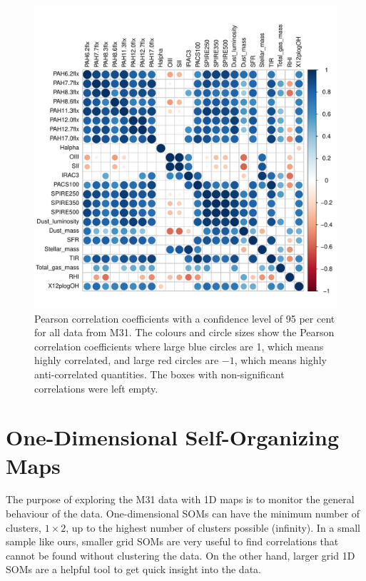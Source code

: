       \begin{figure}
        \centering
        \includegraphics[width=\textwidth]{../image_paper3/images0.01/cor_plots/M31_all_derived_ones_core_plot_for_paper.pdf}
        \caption[Pearson correlation coefficients for data from 10 regions in M31]{Pearson correlation coefficients with a confidence level of 95 per cent for all data from M31. The colours and circle sizes show the Pearson correlation coefficients where large blue circles are 1, which means highly correlated, and large red circles are $-1$, which means highly anti-correlated quantities. The boxes with non-significant correlations were left empty.}
        \label{fig: cor_all}
    \end{figure}
 
\section{One-Dimensional Self-Organizing Maps}
    \label{Sec: 1d_cluster}
    The purpose of  exploring the M31 data with 1D maps is to monitor the general behaviour of the data. 
    One-dimensional SOMs can have the minimum number of clusters, $1\times2$, up to the highest number of clusters possible (infinity). %
    In a small sample like ours, smaller grid SOMs are very useful to find correlations that cannot be found without  clustering the data.
    On the other hand, larger grid 1D SOMs are a helpful tool to get quick insight into the data.

